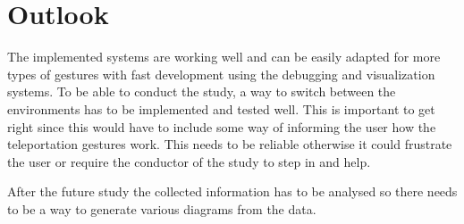 \chapter{Outlook}

The implemented systems are working well and can be easily adapted for more types of gestures with fast development using the debugging and visualization systems. To be able to conduct the study, a way to switch between the environments has to be implemented and tested well. This is important to get right since this would have to include some way of informing the user how the teleportation gestures work. This needs to be reliable otherwise it could frustrate the user or require the conductor of the study to step in and help.  

After the future study the collected information has to be analysed so there needs to be a way to generate various diagrams from the data.